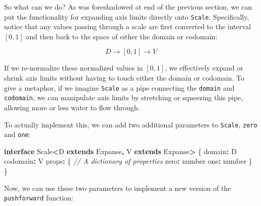 \documentclass[
]{book}
\newenvironment{Shaded}{\begin{snugshade}}{\end{snugshade}}
\newcommand{\CommentTok}[1]{\textcolor[rgb]{0.56,0.35,0.01}{\textit{#1}}}
\newcommand{\DataTypeTok}[1]{\textcolor[rgb]{0.13,0.29,0.53}{#1}}
\newcommand{\KeywordTok}[1]{\textcolor[rgb]{0.13,0.29,0.53}{\textbf{#1}}}
\newcommand{\NormalTok}[1]{#1}
\newcommand{\OperatorTok}[1]{\textcolor[rgb]{0.81,0.36,0.00}{\textbf{#1}}}
\theoremstyle{definition}
\theoremstyle{definition}
\theoremstyle{definition}
\theoremstyle{definition}
\theoremstyle{remark}
\begin{document}
So what can we do? As was foreshadowed at end of the previous section, we can put the functionality for expanding axis limits directly onto \texttt{Scale}. Specifically, notice that any values passing through a scale are first converted to the interval \([0, 1]\) and then back to the space of either the domain or codomain:

\[D \to [0, 1] \to V\]

If we re-normalize these normalized values in \([0, 1]\), we effectively expand or shrink axis limits without having to touch either the domain or codomain. To give a metaphor, if we imagine \texttt{Scale} as a pipe connecting the \texttt{domain} and \texttt{codomain}, we can manipulate axis limits by stretching or squeezing this pipe, allowing more or less water to flow through.

To actually implement this, we can add two additional parameters to \texttt{Scale}, \texttt{zero} and \texttt{one}:

\begin{Shaded}
\begin{Highlighting}[]
\KeywordTok{interface}\NormalTok{ Scale}\OperatorTok{\textless{}}\NormalTok{D }\KeywordTok{extends}\NormalTok{ Expanse}\OperatorTok{,}\NormalTok{ V }\KeywordTok{extends}\NormalTok{ Expanse}\OperatorTok{\textgreater{}}\NormalTok{ \{}
\NormalTok{  domain}\OperatorTok{:}\NormalTok{ D}
\NormalTok{  codomain}\OperatorTok{:}\NormalTok{ V}
\NormalTok{  props}\OperatorTok{:}\NormalTok{ \{ }\CommentTok{// A dictionary of properties}
\NormalTok{    zero}\OperatorTok{:} \DataTypeTok{number}
\NormalTok{    one}\OperatorTok{:} \DataTypeTok{number}
\NormalTok{  \}}
\NormalTok{\}}
\end{Highlighting}
\end{Shaded}

Now, we can use these two parameters to implement a new version of the \texttt{pushforward} function:
\end{document}
